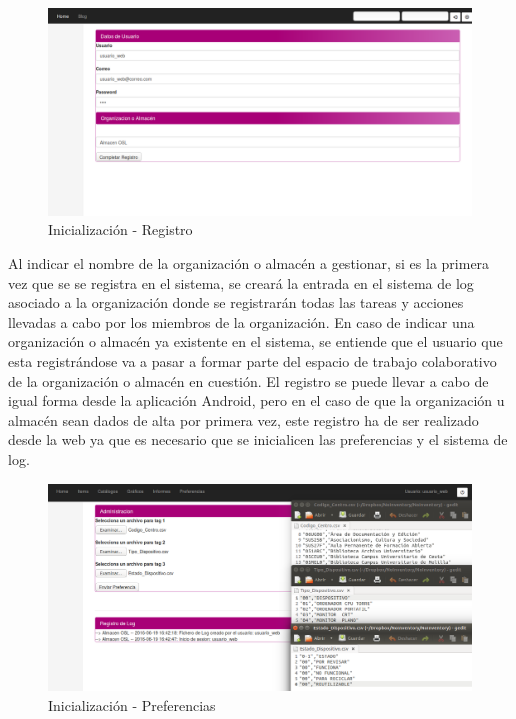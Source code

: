 \documentclass[a4paper,11pt]{book}
\begin{document}
\begin{figure}[H] 
\centering 
\includegraphics[scale=0.2]{imagenes/pruebas/registro.png}
\caption{ Inicialización - Registro\cite{propio}}
\end{figure}

Al indicar el nombre de la organización o almacén a gestionar, si es la primera vez que se se registra en el sistema, se creará la entrada en el sistema de log asociado  a la organización donde se registrarán todas las tareas y acciones llevadas a cabo por los miembros de la organización. En caso de indicar una organización o almacén ya existente en el sistema, se entiende que el usuario que esta registrándose va a pasar a formar parte del espacio de trabajo colaborativo de la organización o almacén en cuestión. El registro se puede llevar a cabo de igual forma desde la aplicación Android, pero en el caso de que la organización u almacén sean dados de alta por primera vez, este registro ha de ser realizado desde la web ya que es necesario que se inicialicen las preferencias y el sistema de log.

\begin{figure}[H] 
\centering 
\includegraphics[scale=0.2]{imagenes/pruebas/preferencias.png}
\caption{ Inicialización - Preferencias\cite{propio}}
\end{figure}
\end{document}
